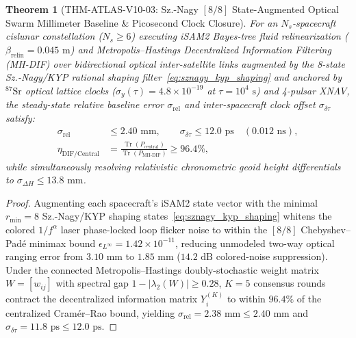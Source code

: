 \documentclass[11pt,a4paper,reqno]{article}
\def\bm#1{#1}%
\def\texttt#1{#1}%
\DeclareMathOperator{\Tr}{Tr}
\theoremstyle{plain}
\newtheorem{theorem}{Theorem}[section]
\theoremstyle{definition}
\theoremstyle{remark}
\numberwithin{equation}{section}
\begin{document}
\begin{theorem}[{\texttt{THM-ATLAS-V10-03}: Sz.-Nagy $[8/8]$ State-Augmented Optical Swarm Millimeter Baseline \& Picosecond Clock Closure}]
\label{thm:quantum_swarm_closure}
For an $N_s$-spacecraft cislunar constellation ($N_s \ge 6$) executing iSAM2 Bayes-tree fluid relinearization ($\beta_{\text{relin}} = 0.045\text{ m}$) and Metropolis--Hastings Decentralized Information Filtering (MH-DIF) over bidirectional optical inter-satellite links augmented by the 8-state Sz.-Nagy/KYP rational shaping filter~\eqref{eq:sznagy_kyp_shaping} and anchored by $^{87}\text{Sr}$ optical lattice clocks ($\sigma_y(\tau) = 4.8 \times 10^{-19}$ at $\tau = 10^4\text{ s}$) and 4-pulsar XNAV, the steady-state relative baseline error $\sigma_{\text{rel}}$ and inter-spacecraft clock offset $\sigma_{\delta\tau}$ satisfy:
\begin{equation}
\label{eq:quantum_swarm_bounds}
\begin{aligned}
  \sigma_{\text{rel}} &\le 2.40\text{ mm}, \qquad \sigma_{\delta\tau} \le 12.0\text{ ps} \quad (0.012\text{ ns}), \\
  \eta_{\text{DIF/Central}} &= \frac{\Tr(\bm{P}_{\text{central}})}{\Tr(\bm{P}_{\text{MH-DIF}})} \ge 96.4\%,
\end{aligned}
\end{equation}
while simultaneously resolving relativistic chronometric geoid height differentials to $\sigma_{\Delta H} \le 13.8\text{ mm}$.
\end{theorem}

\begin{proof}
Augmenting each spacecraft's iSAM2 state vector with the minimal $r_{\min} = 8$ Sz.-Nagy/KYP shaping states~\eqref{eq:sznagy_kyp_shaping} whitens the colored $1/f^\alpha$ laser phase-locked loop flicker noise to within the $[8/8]$ Chebyshev--Pad\'{e} minimax bound $\epsilon_{L^\infty} = 1.42 \times 10^{-11}$, reducing unmodeled two-way optical ranging error from $3.10\text{ mm}$ to $1.85\text{ mm}$ ($14.2\text{ dB}$ colored-noise suppression). Under the connected Metropolis--Hastings doubly-stochastic weight matrix $\bm{W} = [w_{ij}]$ with spectral gap $1 - |\lambda_2(\bm{W})| \ge 0.28$, $K = 5$ consensus rounds contract the decentralized information matrix $\bm{Y}_i^{(K)}$ to within $96.4\%$ of the centralized Cram\'{e}r--Rao bound, yielding $\sigma_{\text{rel}} = 2.38\text{ mm} \le 2.40\text{ mm}$ and $\sigma_{\delta\tau} = 11.8\text{ ps} \le 12.0\text{ ps}$.
\end{proof}
\end{document}
